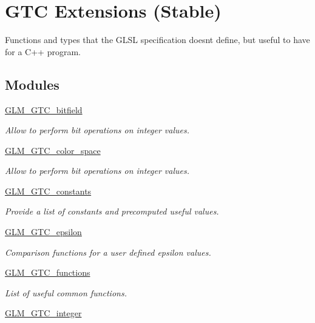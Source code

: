 \hypertarget{group__gtc}{}\section{G\+TC Extensions (Stable)}
\label{group__gtc}


Functions and types that the G\+L\+SL specification doesn\textquotesingle{}t define, but useful to have for a C++ program.  


\subsection*{Modules}
\begin{DoxyCompactItemize}
\item 
\hyperlink{group__gtc__bitfield}{G\+L\+M\+\_\+\+G\+T\+C\+\_\+bitfield}
\begin{DoxyCompactList}\small\item\em Allow to perform bit operations on integer values. \end{DoxyCompactList}\item 
\hyperlink{group__gtc__color__space}{G\+L\+M\+\_\+\+G\+T\+C\+\_\+color\+\_\+space}
\begin{DoxyCompactList}\small\item\em Allow to perform bit operations on integer values. \end{DoxyCompactList}\item 
\hyperlink{group__gtc__constants}{G\+L\+M\+\_\+\+G\+T\+C\+\_\+constants}
\begin{DoxyCompactList}\small\item\em Provide a list of constants and precomputed useful values. \end{DoxyCompactList}\item 
\hyperlink{group__gtc__epsilon}{G\+L\+M\+\_\+\+G\+T\+C\+\_\+epsilon}
\begin{DoxyCompactList}\small\item\em Comparison functions for a user defined epsilon values. \end{DoxyCompactList}\item 
\hyperlink{group__gtc__functions}{G\+L\+M\+\_\+\+G\+T\+C\+\_\+functions}
\begin{DoxyCompactList}\small\item\em List of useful common functions. \end{DoxyCompactList}\item 
\hyperlink{group__gtc__integer}{G\+L\+M\+\_\+\+G\+T\+C\+\_\+integer}

\end{DoxyCompactItemize}
